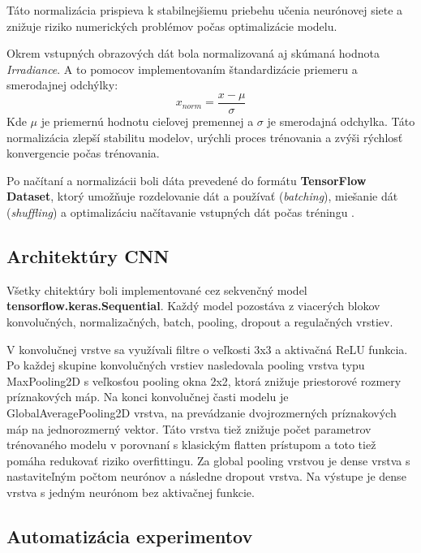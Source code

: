 Táto normalizácia prispieva k stabilnejšiemu priebehu učenia neurónovej siete a znižuje riziko numerických problémov počas optimalizácie modelu.

Okrem vstupných obrazových dát bola normalizovaná aj skúmaná hodnota \textit{Irradiance}. 
A to pomocov implementovaním štandardizácie priemeru a smerodajnej odchýlky:
\begin{equation*}
	{x}_{norm} = \frac{x - \mu}{\sigma}
\end{equation*}
Kde $\mu$ je priemernú hodnotu cieľovej premennej a $\sigma$ je smerodajná odchylka. Táto normalizácia zlepší stabilitu modelov, urýchli proces trénovania a zvýši rýchlosť konvergencie počas trénovania. 

Po načítaní a normalizácii boli dáta prevedené do formátu \textbf{TensorFlow Dataset}, ktorý umožňuje rozdelovanie dát a používať (\textit{batching}), miešanie dát (\textit{shuffling}) a optimalizáciu načítavanie vstupných dát počas tréningu .


\vspace{\baselineskip}
\subsection{Architektúry CNN}

Všetky chitektúry boli implementované cez sekvenčný model  \textbf{tensorflow.keras.Sequential}. Každý model pozostáva z viacerých blokov konvolučných, normalizačných, batch, pooling, dropout a regulačných vrstiev. 

V konvolučnej vrstve sa využívali filtre o veľkosti 3x3 a aktivačná ReLU funkcia. Po každej skupine konvolučných vrstiev nasledovala pooling vrstva typu MaxPooling2D s veľkosťou pooling okna 2x2, ktorá znižuje priestorové rozmery príznakových máp. Na konci konvolučnej časti modelu je GlobalAveragePooling2D vrstva, na prevádzanie dvojrozmerných príznakových máp na jednorozmerný vektor.  Táto vrstva tiež znižuje počet parametrov trénovaného modelu v porovnaní s klasickým flatten prístupom a toto tiež pomáha redukovať riziko overfittingu. Za global pooling vrstvou je dense vrstva s nastaviteľným počtom neurónov a  následne dropout vrstva. Na výstupe je dense vrstva s jedným neurónom bez aktivačnej funkcie. 


\vspace{\baselineskip}
\subsection{Automatizácia experimentov}

